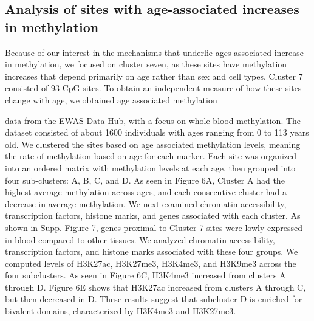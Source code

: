 \documentclass{article}
\begin{document}
{\begin{linenumbers}
\subsection{Analysis of sites with age-associated increases in methylation}
Because of our interest in the mechanisms that underlie ages associated increase in methylation, we focused on cluster seven,  
as these sites have methylation increases that depend primarily on age rather than sex and cell types. Cluster 7 consisted 
of 93 CpG sites. To obtain an independent measure of how these sites change with age, we obtained age associated methylation 

data from the EWAS Data Hub\cite{Xiong2020-fa}, with a focus on whole blood methylation. The dataset consisted of  
about 1600 individuals with ages ranging from 0 to 113 years old\cite{McCartney2019-qi}. We  clustered the sites 
based on age associated methylation levels, meaning the rate of methylation based on age for each marker. Each site 
was organized into an ordered matrix with methylation levels at each age, then grouped into four sub-clusters: A, B, C, and D.
 As seen in Figure 6A, Cluster A had the highest average methylation across ages, and each consecutive cluster had a 
 decrease in average methylation. We next examined chromatin accessibility, transcription factors, histone marks, and 
 genes associated with each cluster.  As shown in Supp. Figure 7, genes proximal to Cluster 7 sites were lowly expressed 
 in blood compared to other tissues.  We analyzed chromatin accessibility, transcription factors, and histone marks 
 associated with these four groups. We computed levels of H3K27ac, H3K27me3, H3K4me3, and H3K9me3 across the four 
 subclusters. As seen in Figure 6C, H3K4me3 increased from clusters A through D. Figure 6E shows that H3K27ac
  increased from clusters A through C, but then decreased in D. These results suggest that subcluster D is 
  enriched for bivalent domains, characterized by H3K4me3 and H3K27me3.


\end{linenumbers}}
\end{document}
